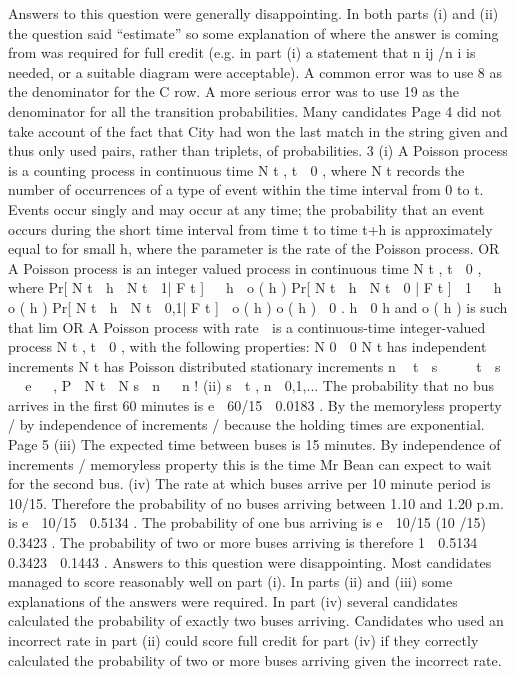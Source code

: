Answers to this question were generally disappointing. In both parts (i) and (ii) the question
said “estimate” so some explanation of where the answer is coming from was required for
full credit (e.g. in part (i) a statement that n ij /n i is needed, or a suitable diagram were
acceptable). A common error was to use 8 as the denominator for the C row. A more serious
error was to use 19 as the denominator for all the transition probabilities. Many candidates
Page 4%
did not take account of the fact that City had won the last match in the string given and thus
only used pairs, rather than triplets, of probabilities.
3
(i)
A Poisson process is a counting process in continuous time { N t , t  0} , where N t
records the number of occurrences of a type of event within the time interval from 0
to t.
Events occur singly and may occur at any time;
the probability that an event occurs during the short time interval from time t to time
t+h is approximately equal to \lambdah for small h, where the parameter \lambda is the rate of the
Poisson process.
OR
A Poisson process is an integer valued process in continuous time { N t , t  0} , where
Pr[ N t  h  N t  1| F t ]   h  o ( h )
Pr[ N t  h  N t  0 | F t ]  1   h  o ( h )
Pr[ N t  h  N t  0,1| F t ]  o ( h )
o ( h )
 0 .
h  0 h
and o ( h ) is such that lim
OR
A Poisson process with rate  is a continuous-time integer-valued process N t , t  0 ,
with the following properties:
N 0  0
N t has independent increments
N t has Poisson distributed stationary increments
n  t  s
    t  s    e  
,
P  N t  N s  n  
n !
(ii)
s  t , n  0,1,...
The probability that no bus arrives in the first 60 minutes is e  60/15  0.0183 .
By the memoryless property / by independence of increments / because the holding
times are exponential.
Page 5%
(iii)
The expected time between buses is 15 minutes.
By independence of increments / memoryless property this is the time Mr Bean can
expect to wait for the second bus.
(iv)
The rate at which buses arrive per 10 minute period is 10/15.
Therefore the probability of no buses arriving between 1.10 and 1.20 p.m. is
e  10/15  0.5134 .
The probability of one bus arriving is e  10/15 (10 /15)  0.3423 .
The probability of two or more buses arriving is therefore
1  0.5134  0.3423  0.1443 .
Answers to this question were disappointing. Most candidates managed to score reasonably
well on part (i). In parts (ii) and (iii) some explanations of the answers were required. In
part (iv) several candidates calculated the probability of exactly two buses arriving.
Candidates who used an incorrect rate in part (ii) could score full credit for part (iv) if they
correctly calculated the probability of two or more buses arriving given the incorrect rate.
